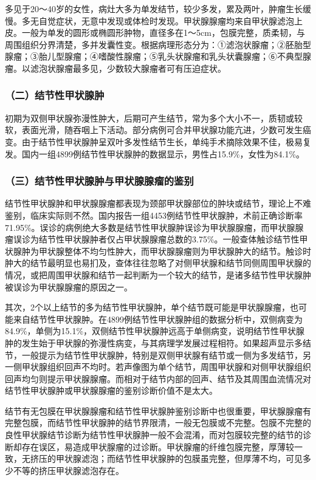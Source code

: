 多见于20～40岁的女性，病灶大多为单发结节，较少多发，累及两叶，肿瘤生长缓慢。多无自觉症状，无意中发现或体检时发现。甲状腺腺瘤均来自甲状腺滤泡上皮。一般为单发的圆形或椭圆形肿物，直径多在1～5cm，包膜完整，质柔韧，与周围组织分界清楚，多并发囊性变。根据病理形态分为：①滤泡状腺瘤；②胚胎型腺瘤；③胎儿型腺瘤；④嗜酸性腺瘤；⑤乳头状腺瘤和乳头状囊腺瘤；⑥不典型腺瘤。以滤泡状腺瘤最多见，少数较大腺瘤者可有压迫症状。

\subsubsection{（二）结节性甲状腺肿}

初期为双侧甲状腺弥漫性肿大，后期可产生结节，常为多个大小不一，质韧或较软，表面光滑，随吞咽上下活动。部分病例可合并甲状腺功能亢进，少数可发生癌变。由于结节性甲状腺肿呈双叶多发性结节生长，单纯手术摘除效果不佳，极易复发。国内一组4899例结节性甲状腺肿的数据显示，男性占15.9\%，女性为84.1\%。

\subsubsection{（三）结节性甲状腺肿与甲状腺腺瘤的鉴别}

结节性甲状腺肿和甲状腺腺瘤都表现为颈部甲状腺部位的肿块或结节，理论上不难鉴别，临床实际则不然。国内报告一组4453例结节性甲状腺肿，术前正确诊断率71.95\%。误诊的病例绝大多数是结节性甲状腺肿误诊为甲状腺腺瘤，而甲状腺腺瘤误诊为结节性甲状腺肿者仅占甲状腺腺瘤总数的3.75\%。一般查体触诊结节性甲状腺肿为甲状腺整体不均匀性肿大，而甲状腺腺瘤则为甲状腺肿大的结节。触诊时肿大的结节最明显也易扪及，查体往往忽略了对侧甲状腺和结节同侧周围甲状腺的情况，或把周围甲状腺和结节一起判断为一个较大的结节，是诸多结节性甲状腺肿被误诊为甲状腺腺瘤的原因之一。

其次，2个以上结节的多为结节性甲状腺肿，单个结节既可能是甲状腺腺瘤，也可能来自结节性甲状腺肿。在4899例结节性甲状腺肿组的数据分析中，双侧病变为84.9\%，单侧为15.1\%，双侧结节性甲状腺肿远高于单侧病变，说明结节性甲状腺肿的发生始于甲状腺的弥漫性病变，与其病理学发展过程相符。如果超声显示多结节，一般提示为结节性甲状腺肿，特别是双侧甲状腺有结节或一侧为多发结节，另一侧甲状腺组织回声不均时。若声像图为单个结节，周围甲状腺和对侧甲状腺组织回声均匀则提示甲状腺腺瘤。而相对于结节内部的回声、结节及其周围血流情况对结节性甲状腺肿或甲状腺腺瘤的鉴别诊断价值不是太大。

结节有无包膜在甲状腺腺瘤和结节性甲状腺肿鉴别诊断中也很重要，甲状腺腺瘤有完整包膜，而结节性甲状腺肿的结节界限清，一般无包膜或不完整。包膜不完整的良性甲状腺结节诊断为结节性甲状腺肿一般不会混淆，而对包膜较完整的结节的诊断却存在误区，易造成甲状腺瘤的过诊断。甲状腺瘤的纤维包膜完整，厚薄较一致，无挤压的甲状腺滤泡；而结节性甲状腺肿的包膜虽完整，但厚薄不均，可见多少不等的挤压甲状腺滤泡存在。

